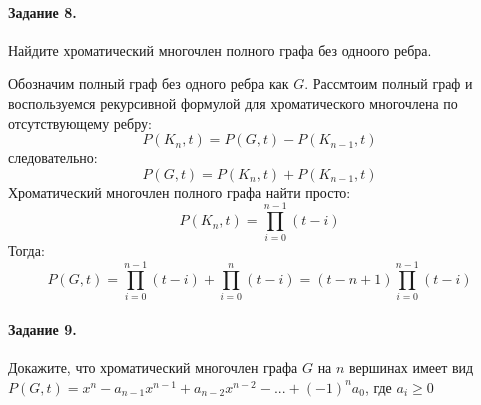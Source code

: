 \documentclass[a4paper,12pt]{article}
\begin{document}
\paragraph{Задание 8.} Найдите хроматический многочлен полного графа без одноого ребра.

\begin{Solution}
Обозначим полный граф без одного ребра как $G$. Рассмтоим полный граф и воспользуемся рекурсивной формулой для хроматического многочлена по отсутствующему ребру:
\[
	P\left(K_n,t\right) = P\left(G, t\right) - P\left(K_{n-1},t\right)
\]
следовательно:
\[
	P\left(G, t\right) = P\left(K_n,t\right) + P\left(K_{n-1},t\right)
\]
Хроматический многочлен полного графа найти просто:
\[
	P\left(K_n,t\right) = \prod_{i=0}^{n-1} \left(t-i\right)
\]
Тогда:
\[
	P\left(G, t\right) = \prod_{i=0}^{n-1} \left(t-i\right) + \prod_{i=0}^n \left(t-i\right) = \left(t-n+1\right) \prod_{i=0}^{n-1} \left(t-i\right)
\]
\end{Solution}

\paragraph{Задание 9.} Докажите, что хроматический многочлен графа $G$ на $n$ вершинах имеет вид $P\left(G,t\right) = x^n - a_{n-1} x^{n-1} + a_{n-2} x^{n-2} - ... + \left(-1\right)^n a_0$, где $a_i \ge 0$
\end{document}
